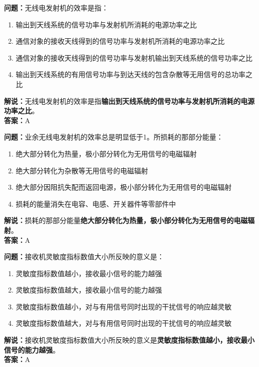 \textbf{问题：}无线电发射机的效率是指：

\begin{enumerate}[label=\Alph*), leftmargin=1cm]
	\item 输出到天线系统的信号功率与发射机所消耗的电源功率之比
	\item 通信对象的接收天线得到的信号功率与发射机所消耗的电源功率之比
	\item 通信对象的接收天线得到的信号功率与发射机输出到天线系统的信号功率之比
	\item 输出到天线系统的有用信号功率与到达天线的包含杂散等无用信号的总功率之比
\end{enumerate}

\textbf{解说：}无线电发射机的效率是指\textbf{输出到天线系统的信号功率与发射机所消耗的电源功率之比}。\\\textbf{答案：}A%



\textbf{问题：}业余无线电发射机的效率总是明显低于1。所损耗的那部分能量：

\begin{enumerate}[label=\Alph*), leftmargin=1cm]
	\item 绝大部分转化为热量，极小部分转化为无用信号的电磁辐射
	\item 绝大部分转化为杂散等无用信号的电磁辐射
	\item 绝大部分因阻抗失配而返回电源，极小部分转化为无用信号的电磁辐射
	\item 损耗的能量消失在电容、电感、开关器件等零部件中
\end{enumerate}

\textbf{解说：}损耗的那部分能量\textbf{绝大部分转化为热量，极小部分转化为无用信号的电磁辐射}。\\\textbf{答案：}A%



\textbf{问题：}接收机灵敏度指标数值大小所反映的意义是：

\begin{enumerate}[label=\Alph*), leftmargin=1cm]
	\item 灵敏度指标数值越小，接收最小信号的能力越强
	\item 灵敏度指标数值越大，接收最小信号的能力越强
	\item 灵敏度指标数值越小，对与有用信号同时出现的干扰信号的响应越灵敏
	\item 灵敏度指标数值越大，对与有用信号同时出现的干扰信号的响应越灵敏
\end{enumerate}

\textbf{解说：}接收机灵敏度指标数值大小所反映的意义是\textbf{灵敏度指标数值越小，接收最小信号的能力越强}。\\\textbf{答案：}A%



